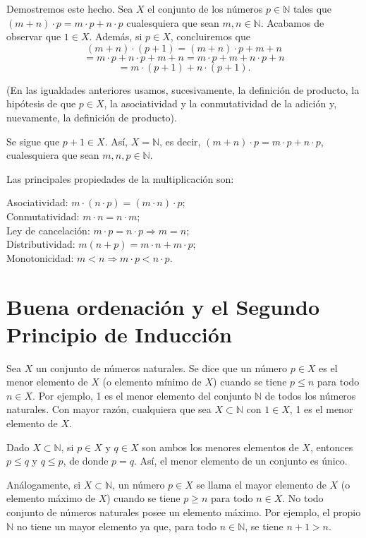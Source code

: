 \documentclass[12pt,oneside]{book}
\begin{document}
Demostremos este hecho. Sea \(X\) el conjunto de los números \(p \in \mathbb{N}\) tales que \((m + n) \cdot p = m \cdot p + n \cdot p\) cualesquiera que sean \(m, n \in \mathbb{N}\). Acabamos de observar que \(1 \in X\). Además, si \(p \in X\), concluiremos que
\[
(m + n) \cdot (p + 1) = (m + n) \cdot p + m + n
\]
\[
= m \cdot p + n \cdot p + m + n = m \cdot p + m + n \cdot p + n
\]
\[
= m \cdot (p + 1) + n \cdot (p + 1).
\]

(En las igualdades anteriores usamos, sucesivamente, la definición de producto, la hipótesis de que \(p \in X\), la asociatividad y la conmutatividad de la adición y, nuevamente, la definición de producto).

Se sigue que \(p + 1 \in X\). Así, \(X = \mathbb{N}\), es decir, \((m + n) \cdot p = m \cdot p + n \cdot p\), cualesquiera que sean \(m, n, p \in \mathbb{N}\).

Las principales propiedades de la multiplicación son:

Asociatividad: \(m \cdot (n \cdot p) = (m \cdot n) \cdot p\);\\
Conmutatividad: \(m \cdot n = n \cdot m\);\\
Ley de cancelación: \(m \cdot p = n \cdot p \Rightarrow m = n\);\\
Distributividad: \(m(n + p) = m \cdot n + m \cdot p\);\\
Monotonicidad: \(m < n \Rightarrow m \cdot p < n \cdot p\).

\section{Buena ordenación y el Segundo Principio de Inducción}

Sea \( X \) un conjunto de números naturales. Se dice que un número \( p \in X \) es el menor elemento de \( X \) (o elemento mínimo de \( X \)) cuando se tiene \( p \leq n \) para todo \( n \in X \). Por ejemplo, 1 es el menor elemento del conjunto \( \mathbb{N} \) de todos los números naturales. Con mayor razón, cualquiera que sea \( X \subset \mathbb{N} \) con \( 1 \in X \), 1 es el menor elemento de \( X \).

Dado \( X \subset \mathbb{N} \), si \( p \in X \) y \( q \in X \) son ambos los menores elementos de \( X \), entonces \( p \leq q \) y \( q \leq p \), de donde \( p = q \). Así, el menor elemento de un conjunto es único.

Análogamente, si \( X \subset \mathbb{N} \), un número \( p \in X \) se llama el mayor elemento de \( X \) (o elemento máximo de \( X \)) cuando se tiene \( p \geq n \) para todo \( n \in X \). No todo conjunto de números naturales posee un elemento máximo. Por ejemplo, el propio \( \mathbb{N} \) no tiene un mayor elemento ya que, para todo \( n \in \mathbb{N} \), se tiene \( n + 1 > n \).
\end{document}
